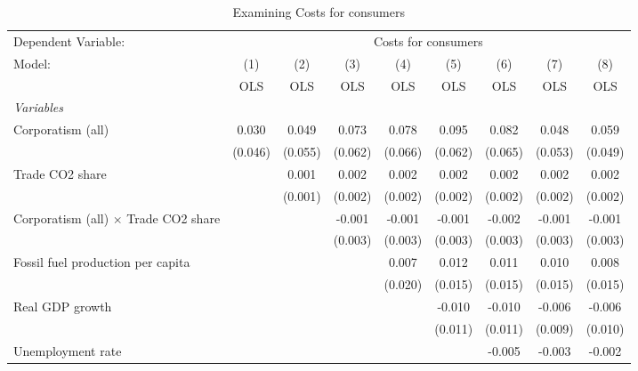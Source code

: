 
\begin{table}[htbp]
   \caption{Examining Costs for consumers}
   \centering
   \begin{tabular}{lcccccccc}
      \toprule
      Dependent Variable: & \multicolumn{8}{c}{Costs for consumers}\\
      Model:                                      & (1)     & (2)     & (3)     & (4)     & (5)     & (6)     & (7)     & (8)\\  
                                                  &  OLS    & OLS     & OLS     & OLS     & OLS     & OLS     & OLS     & OLS\\  
      \midrule
      \emph{Variables}\\
      Corporatism (all)                           & 0.030   & 0.049   & 0.073   & 0.078   & 0.095   & 0.082   & 0.048   & 0.059\\   
                                                  & (0.046) & (0.055) & (0.062) & (0.066) & (0.062) & (0.065) & (0.053) & (0.049)\\   
      Trade CO2 share                             &         & 0.001   & 0.002   & 0.002   & 0.002   & 0.002   & 0.002   & 0.002\\   
                                                  &         & (0.001) & (0.002) & (0.002) & (0.002) & (0.002) & (0.002) & (0.002)\\   
      Corporatism (all) $\times$ Trade CO2 share  &         &         & -0.001  & -0.001  & -0.001  & -0.002  & -0.001  & -0.001\\   
                                                  &         &         & (0.003) & (0.003) & (0.003) & (0.003) & (0.003) & (0.003)\\   
      Fossil fuel production per capita           &         &         &         & 0.007   & 0.012   & 0.011   & 0.010   & 0.008\\   
                                                  &         &         &         & (0.020) & (0.015) & (0.015) & (0.015) & (0.015)\\   
      Real GDP growth                             &         &         &         &         & -0.010  & -0.010  & -0.006  & -0.006\\   
                                                  &         &         &         &         & (0.011) & (0.011) & (0.009) & (0.010)\\   
      Unemployment rate                           &         &         &         &         &         & -0.005  & -0.003  & -0.002\\   

\end{tabular}
\end{table}
